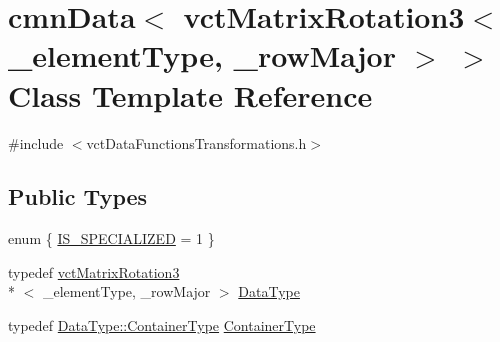 \hypertarget{classcmn_data_3_01vct_matrix_rotation3_3_01__element_type_00_01__row_major_01_4_01_4}{\section{cmn\-Data$<$ vct\-Matrix\-Rotation3$<$ \-\_\-element\-Type, \-\_\-row\-Major $>$ $>$ Class Template Reference}
\label{classcmn_data_3_01vct_matrix_rotation3_3_01__element_type_00_01__row_major_01_4_01_4}
}


{\ttfamily \#include $<$vct\-Data\-Functions\-Transformations.\-h$>$}

\subsection*{Public Types}
\begin{DoxyCompactItemize}
\item 
enum \{ \hyperlink{classcmn_data_3_01vct_matrix_rotation3_3_01__element_type_00_01__row_major_01_4_01_4_a15b6e2a571428292a28e53b16ef04b9baebd0311ce7a9504d1e214752ee6778eb}{I\-S\-\_\-\-S\-P\-E\-C\-I\-A\-L\-I\-Z\-E\-D} = 1
 \}
\item 
typedef \hyperlink{classvct_matrix_rotation3}{vct\-Matrix\-Rotation3}\\*
$<$ \-\_\-element\-Type, \-\_\-row\-Major $>$ \hyperlink{classcmn_data_3_01vct_matrix_rotation3_3_01__element_type_00_01__row_major_01_4_01_4_a16ee28dba714864959664e5a1567db82}{Data\-Type}
\item 
typedef \hyperlink{classvct_matrix_rotation3_a1f8796d5368dbda35c3b57c6395b6dd0}{Data\-Type\-::\-Container\-Type} \hyperlink{classcmn_data_3_01vct_matrix_rotation3_3_01__element_type_00_01__row_major_01_4_01_4_a220f0a68d567275fede9e0124441ae86}{Container\-Type}
\end{DoxyCompactItemize}
